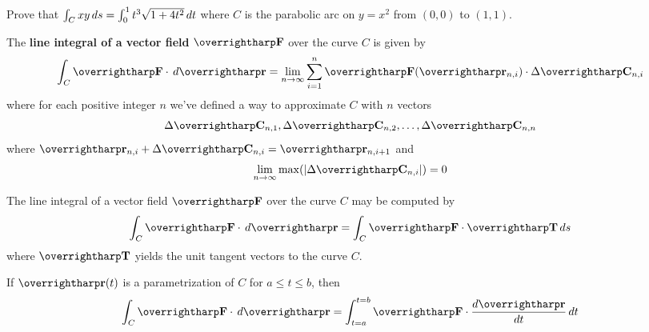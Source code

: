 \documentclass[letterpaper, twoside, 12pt]{book}
\begin{document}
          \begin{solution}

          \end{solution}

          \begin{contributors}

          \end{contributors}

          \begin{problem}
            Prove that $\int_C xy\,d{s}=\int_0^1 t^3\sqrt{1+4t^2}\,d{t}$
            where $C$ is the parabolic arc
            on $y=x^2$ from $(0,0)$ to $(1,1)$.
          \end{problem}

          \begin{solution}

          \end{solution}

          \begin{contributors}

          \end{contributors}

\begin{definition}
The \textbf{line integral of a vector field} $\vect F$
over the curve $C$ is given by
  \[
    \int_C \vect F\cdot\dvar{\vect r} =
    \lim_{n\to\infty}\sum_{i=1}^n
    \vect F(\vect{r}_{n,i})\cdot\Delta\vect{C}_{n,i}
  \]
where for each positive integer $n$ we've defined a way to approximate $C$
with $n$ vectors
  \[
    \Delta \vect{C}_{n,1},\Delta \vect{C}_{n,2},\dots,\Delta \vect{C}_{n,n}
  \]
where $\vect{r}_{n,i}+\Delta \vect{C}_{n,i}=\vect{r}_{n,i+1}$
and
  \[
    \lim_{n\to\infty} \max(|\Delta \vect{C}_{n,i}|) = 0
  \]
\end{definition}

\begin{definition}
The line integral of a vector field $\vect F$ over the curve $C$
may be computed by
    \[
      \int_C \vect{F}\cdot\dvar{\vect r}
        =
      \int_C \vect{F}\cdot\vect{T}\dvar{s}
    \]
where $\vect T$ yields the unit tangent vectors to the curve $C$.
\end{definition}

\begin{definition}
If $\vect{r}(t)$ is a parametrization of $C$ for $a \leq t \leq b$, then
    \[
      \int_C \vect{F}\cdot\dvar{\vect r}
        =
      \int_{t=a}^{t=b} \vect{F}\cdot\frac{d\vect{r}}{dt}\dvar{t}
    \]
\end{definition}
\end{document}
